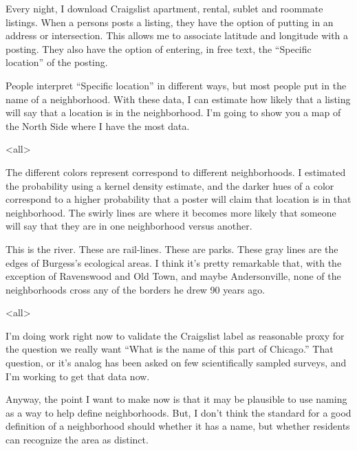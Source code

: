 {Every night, I download Craigslist apartment, rental, sublet and
roommate listings. When a persons posts a listing, they have the
option of putting in an address or intersection. This allows me to
associate latitude and longitude with a posting. They also have the
option of entering, in free text, the ``Specific location'' of the
posting.

People interpret ``Specific location'' in different ways, but most
people put in the name of a neighborhood.  With these data, I can
estimate how likely that a listing will say that a location is in the
neighborhood. I'm going to show you a map of the North Side where I
have the most data.

\mode<all>{
}

The different colors represent correspond to different
neighborhoods. I estimated the probability using a kernel density
estimate, and the darker hues of a color correspond to a higher
probability that a poster will claim that location is in that
neighborhood. The swirly lines are where it becomes more likely that
someone will say that they are in one neighborhood versus another.

This is the river. These are rail-lines. These are parks. These gray
lines are the edges of Burgess's ecological areas. I think it's pretty
remarkable that, with the exception of Ravenswood and Old Town, and
maybe Andersonville, none of the neighborhoods cross any of the
borders he drew 90 years ago.

\mode<all>{
}

I'm doing work right now to validate the Craigslist label as
reasonable proxy for the question we really want ``What is the name of
this part of Chicago.'' That question, or it's analog has been asked
on few scientifically sampled surveys, and I'm working to get that
data now.

Anyway, the point I want to make now is that it may be plausible to
use naming as a way to help define neighborhoods. But, I don't think
the standard for a good definition of a neighborhood should whether it
has a name, but whether residents can recognize the area as distinct.

}
